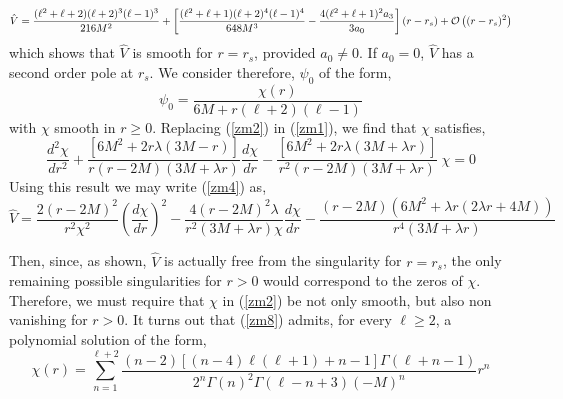 \documentclass[aps,floats,showpacs,amssymb,tightenlines]{revtex4}
\begin{document}
\begin{equation}\label{zm7}
\hat V = \frac{(\ell^2+\ell+2)(\ell+2)^3(\ell-1)^3}{216 M^2} +\left[\frac{(\ell^2+\ell+1)(\ell+2)^4(\ell-1)^4}{648 M^3}-\frac{4 (\ell^2+\ell+1)^2 a_3}{3 a_0}\right](r-r_s)+{\cal{O}}\left((r-r_s)^2\right)
\end{equation}
which shows that $\hat V$ is smooth for $r=r_s$, provided $a_0 \neq 0$. If $a_0=0$, $\hat V$ has a second order
pole at $r_s$. We consider therefore, $\psi_0$ of the form,
\begin{equation}\label{zm2}
\psi_0=\frac{\chi(r)}{6 M+r(\ell+2)(\ell-1)}
\end{equation}
with $\chi$ smooth in $ r \geq 0$. Replacing (\ref{zm2}) in (\ref{zm1}), we find that $\chi$ satisfies,
\begin{equation}\label{zm8}
\frac{d^2 \chi}{dr^2} +\frac{\left[6M^2+2 r \lambda(3M-r)\right]}{r(r-2M)(3M+\lambda r)}\frac{d \chi}{dr}
-\frac{\left[6M^2+2 r \lambda(3M+\lambda r)\right]}{r^2(r-2M)(3M+\lambda r)}\  \chi =0
\end{equation}
Using this result we may write (\ref{zm4}) as,
\begin{equation}\label{zm5a}
\hat{V} = \frac{2(r-2M)^2}{r^2 \chi^2}\left(\frac{d\chi}{dr}\right)^2
-\frac{4(r-2M)^2 \lambda}{r^2 (3M+\lambda r) \chi}\frac{d\chi}{dr}-
\frac{(r-2M)(6M^2+\lambda r (2\lambda r+4M))} {r^4 (3M+\lambda r)}
\end{equation}

Then, since, as shown, $\hat V$ is actually free from the singularity for $r=r_s$, the only remaining possible singularities for $r >0$ would correspond to the zeros of $\chi$. Therefore, we must require that $\chi$ in (\ref{zm2}) be not only smooth, but also non vanishing for $r>0$. It turns out that (\ref{zm8}) admits, for every $\ell \geq 2$, a polynomial solution of the form,
\begin{equation} \label{zm3}
\chi(r)=\sum_{n=1}^{\ell+2}\frac{(n-2)\left[(n-4)\ell(\ell+1)+n-1\right]\Gamma(\ell+n-1)
}{ 2^{n}\Gamma(n)^2\Gamma(\ell-n+3) (-M)^{n}}r^n
\end{equation}
\end{document}
